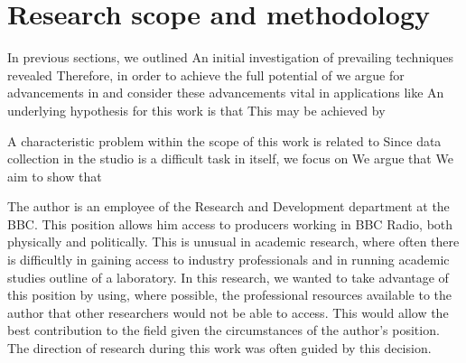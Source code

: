 \section{Research scope and methodology}

In previous sections, we outlined
An initial investigation of prevailing techniques revealed
Therefore, in order to achieve the full potential of 
we argue for advancements in 
and consider these advancements vital in applications like 
An underlying hypothesis for this work is that
This may be achieved by

A characteristic problem within the scope of this work is related to 
Since data collection in the studio is a difficult task in itself, we focus on
We argue that
We aim to show that

The author is an employee of the  Research and Development department at the BBC. This position allows him access to
producers working in BBC Radio, both physically and politically. This is unusual in academic research, where often
there is difficultly in gaining access to industry professionals and in running academic studies outline of a
laboratory. In this research, we wanted to take advantage of this position by using, where possible, the professional
resources available to the author that other researchers would not be able to access. This would allow the best
contribution to the field given the circumstances of the author's position. The direction of research during this work
was often guided by this decision.

